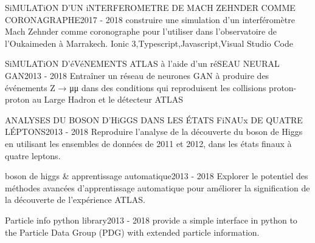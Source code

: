%
%
%


\begin{projects}
	\project
	{SiMULATiON D'UN iNTERFEROMETRE DE MACH ZEHNDER COMME CORONAGRAPHE}{2017 - 2018}
	{ }
	{construire une simulation d'un interféromètre Mach Zehnder comme coronographe pour l'utiliser dans l'observatoire de l'Oukaimeden à Marrakech.}
	{Ionic 3,Typescript,Javascript,Visual Studio Code}
				
	\project
	{SiMULATiON D'éVéNEMENTS ATLAS à l'aide d'un réSEAU NEURAL GAN}{2013 - 2018}
	{ }
	{Entraîner un réseau de neurones GAN à produire des événements Z → μμ dans des conditions qui reproduisent les collisions proton-proton au Large Hadron et le détecteur ATLAS}
	{}

	\project
	{ANALYSES DU BOSON D'HiGGS DANS LES ÉTATS FiNAUx DE QUATRE LÉPTONS}{2013 - 2018}
	{ }
	{Reproduire l'analyse de la découverte du boson de Higgs en utilisant les ensembles de données de 2011 et 2012, dans les états finaux à quatre leptons.}
	{}

	\project
	{boson de higgs \& apprentissage automatique}{2013 - 2018}
	{ }
	{Explorer le potentiel des méthodes avancées d'apprentissage automatique pour améliorer la signification de la découverte de l'expérience ATLAS.}
	{}

	\project
	{Particle info python library}{2013 - 2018}
	{ }
	{provide a simple interface in python to the Particle Data Group (PDG) with extended particle information.}
	{}
\end{projects}


